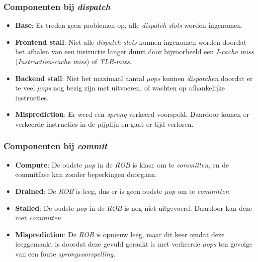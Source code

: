 \documentclass[12pt,a4paper,faculty=ea,language=nl]{ugent-doc}
\begin{document}
\subsubsection{Componenten bij \textit{dispatch}}
\label{subsubsection:dispatch toestanden}
\begin{itemize}
    \item \textbf{Base}: Er treden geen problemen op, alle \textit{dispatch slots} worden ingenomen.

    \item \textbf{Frontend stall}: Niet alle \textit{dispatch slots} kunnen ingenomen worden doordat het afhalen van een instructie langer duurt door bijvoorbeeld een \textit{I-cache miss} (\textit{Instruction-cache miss}) of \textit{TLB-miss}.

    \item \textbf{Backend stall}: Niet het maximaal aantal \textit{µops} kunnen \textit{dispatchen} doordat er te veel \textit{µops} nog bezig zijn met uitvoeren, of wachten op afhankelijke instructies.

    \item \textbf{Misprediction}: Er werd een \textit{sprong} verkeerd voorspeld. Daardoor komen er verkeerde instructies in de pijplijn en gaat er tijd verloren.
\end{itemize}

\subsubsection{Componenten bij \textit{commit}}
\label{subsubsection:commit toestanden}
\begin{itemize}
    \item \textbf{Compute}: De oudste \textit{µop} in de \textit{ROB} is klaar om te \textit{committen}, en de commitfase kan zonder beperkingen doorgaan.

    \item \textbf{Drained}: De \textit{ROB} is leeg, dus er is geen oudste \textit{µop} om te \textit{committen}.

    \item \textbf{Stalled}: De oudste \textit{µop} in de \textit{ROB} is nog niet uitgevoerd. Daardoor kan deze niet \textit{committen}.

    \item \textbf{Misprediction}: De \textit{ROB} is opnieuw leeg, maar dit keer omdat deze leeggemaakt is doordat deze gevuld geraakt is met verkeerde \textit{µops} ten gevolge van een foute \textit{sprongvoorspelling}.
\end{itemize}
\end{document}
